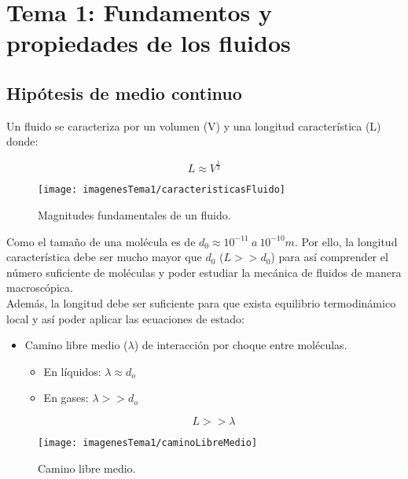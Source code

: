 \section{Tema 1: Fundamentos y propiedades de los fluidos}
\subsection{Hipótesis de medio continuo}
Un fluido se caracteriza por un volumen (V) y una longitud característica (L) donde:

\[L \approx V^{\frac{1}{3}}\]

\begin{figure}[H]
	\centering
	\texttt{[image: imagenesTema1/caracteristicasFluido]}
	\caption{Magnitudes fundamentales de un fluido.}
	\label{fig:caracteristicasfluido}
\end{figure}
Como el tamaño de una molécula es de $d_0 \approx 10^{-11} \ a \ 10^{-10} m$. Por ello, la longitud característica debe ser mucho mayor que $d_0$ ($L>>d_0$) para así comprender el número suficiente de moléculas y poder estudiar la mecánica de fluidos de manera macroscópica.\\

Además, la longitud debe ser suficiente para que exista equilibrio termodinámico local y así poder aplicar las ecuaciones de estado:

\begin{itemize}
	\item Camino libre medio ($\lambda$) de interacción por choque entre moléculas.
	\begin{itemize}
		\item En líquidos: $\lambda \approx d_o$
		\item En gases: $\lambda >> d_o$
	\end{itemize}
	\[L >> \lambda\]
\end{itemize}

\begin{figure}[H]
	\centering
	\texttt{[image: imagenesTema1/caminoLibreMedio]}
	\caption{Camino libre medio.}
	\label{fig:caminolibremedio}
\end{figure}

